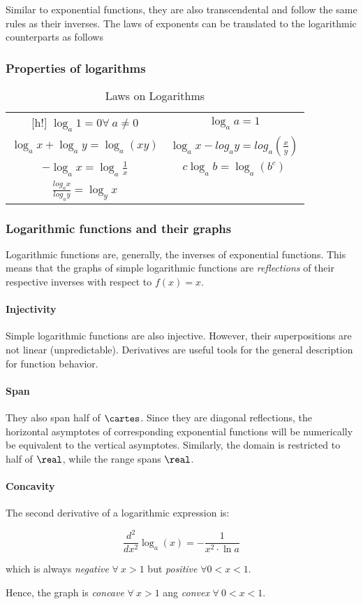 Similar to exponential functions, they are also transcendental and follow the same rules as their inverses.
The laws of exponents can be translated to the logarithmic counterparts as follows

\subsubsection{Properties of logarithms}

\begin{table}
  \centering
  \caption{Laws on Logarithms}

  \begin{tabular}{c|c}[h!]
    $\log_a 1 = 0 \forall\ a \neq 0$ & $\log_a a = 1$ \\
    $\log_a x + \log_a y = \log_a (xy)$ & $\log_a x - log_a y = log_a (\frac{x}{y})$ \\
    $-\log_a x = \log_a \frac{1}{x}$ & $c\log_a b = \log_a (b^c)$ \\
    $\frac{log_a x}{log_a y} = \log_y x$
  \end{tabular}

\end{table}

\subsubsection{Logarithmic functions and their graphs}

Logarithmic functions are, generally, the inverses of exponential functions.
This means that the graphs of simple logarithmic functions are \emph{reflections} of their respective inverses with respect to $f(x) = x$.

\paragraph{Injectivity} Simple logarithmic functions are also injective.
However, their superpositions are not linear (unpredictable).
Derivatives are useful tools for the general description for function behavior.

\paragraph{Span} They also span half of $\cartes$.
Since they are diagonal reflections, the horizontal asymptotes of corresponding exponential functions will be numerically be equivalent to the vertical asymptotes.
Similarly, the domain is restricted to half of $\real$, while the range spans $\real$.

\paragraph{Concavity}
The second derivative of a logarithmic expression is:

$$\frac{d^2}{dx^2} \log_a (x) = -\frac{1}{x^2 \cdot \ln{a}}$$

which is always \emph{negative} $\forall\ x > 1$ but \emph{positive} $\forall 0 < x < 1$.

Hence, the graph is \emph{concave} $\forall\ x > 1$ ang \emph{convex} $\forall\ 0 < x < 1$.
